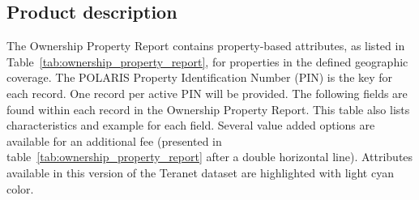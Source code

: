 \subsection{Product description} \label{subsec:teranet_product_description}

The Ownership Property Report contains property-based attributes, as listed in Table~\ref{tab:ownership_property_report}, for properties in the defined geographic coverage.
The POLARIS Property Identification Number (PIN) is the key for each record.
One record per active PIN will be provided.
The following fields are found within each record in the Ownership Property Report.
This table also lists characteristics and example for each field.
Several value added options are available for an additional fee (presented in table~\ref{tab:ownership_property_report} after a double horizontal line).
Attributes available in this version of the Teranet dataset are highlighted with light cyan color.


